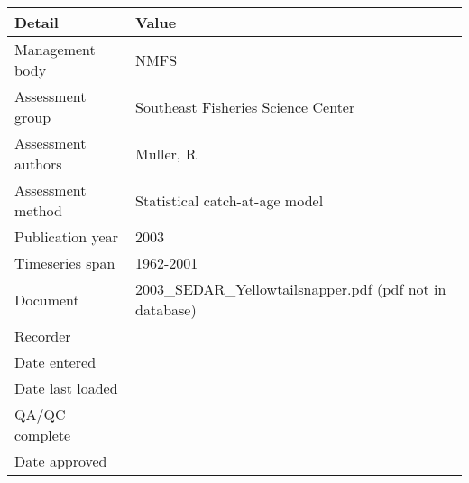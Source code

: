 \begin{table}[htb]
\centering
\begin{tabular}{lp{7cm}}
\toprule
Detail & Value \\
\midrule
Management body    & NMFS                                                     \\
Assessment group   & Southeast Fisheries Science Center                       \\
Assessment authors & Muller, R                                                \\
Assessment method  & Statistical catch-at-age model                           \\
Publication year   & 2003                                                     \\
Timeseries span    & 1962-2001                                                \\
Document           & 2003\_SEDAR\_Yellowtailsnapper.pdf (pdf not in database) \\
Recorder           &                                                          \\
Date entered       &                                                          \\
Date last loaded   &                                                          \\
QA/QC complete     &                                                          \\
Date approved      &                                                          \\
\bottomrule
\end{tabular}
\label{tab:assessdet}
\end{table}
